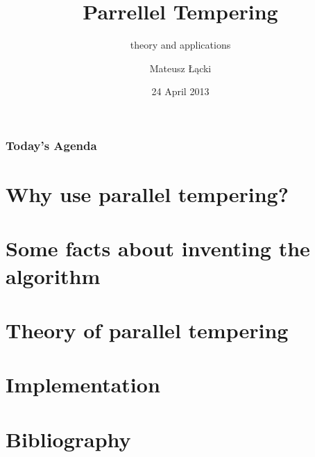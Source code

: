 \documentclass[xetex]{beamer}
\title[Parrellel Tempering]{Parrellel Tempering }
\subtitle{theory and applications}
\date{24 April 2013}
\author[Łącki]{Mateusz Łącki}
\institute[UW]{Uniwersytet Warszawski}
\begin{document}


	\begin{frame}
		\titlepage
	\end{frame}

	\begin{frame}
		\frametitle{Today's Agenda}
		\tableofcontents
	\end{frame}
	

	\section[Why bother?]{Why use parallel tempering?}
	
	\section[History]{Some facts about inventing the algorithm}

	\section[History]{Theory of parallel tempering}

	\section[History]{Implementation}

	\section[Sources]{Bibliography}
		

\end{document}
